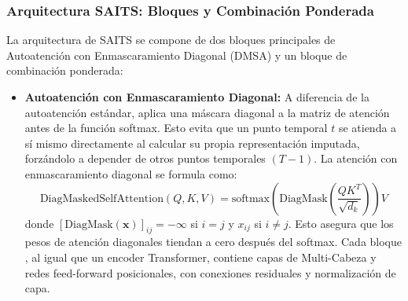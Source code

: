 \subsubsection*{Arquitectura SAITS: Bloques  y Combinación Ponderada}
La arquitectura de SAITS se compone de dos bloques principales de Autoatención con Enmascaramiento Diagonal (DMSA) y un bloque de combinación ponderada:

\begin{itemize}
    \item \textbf{Autoatención con Enmascaramiento Diagonal:}
    A diferencia de la autoatención estándar,  aplica una máscara diagonal a la matriz de atención antes de la función softmax. Esto evita que un punto temporal $t$ se atienda a sí mismo directamente al calcular su propia representación imputada, forzándolo a depender de otros puntos temporales $(T-1)$.
    La atención con enmascaramiento diagonal se formula como:
    \begin{equation}
    \text{DiagMaskedSelfAttention}(Q, K, V) = \text{softmax}\left(\text{DiagMask}\left( \frac{QK^T}{\sqrt{d_k}} \right)\right)V
    \label{eq:dmsa}
    \end{equation}
    donde $[\text{DiagMask}(\mathbf{x})]_{ij} = -\infty$ si $i=j$ y $x_{ij}$ si $i \neq j$. Esto asegura que los pesos de atención diagonales tiendan a cero después del softmax. Cada bloque , al igual que un encoder Transformer, contiene capas de  Multi-Cabeza y redes feed-forward posicionales, con conexiones residuales y normalización de capa.


\end{itemize}

